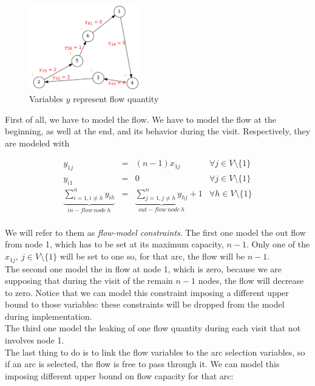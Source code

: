 \begin{figure}[h]
    \centering
    \includegraphics[width=0.43\textwidth]{figures/gg}
    \caption[GG example]{Variables $y$ represent flow quantity}
    \label{fig:GG_example}
\end{figure}

First of all, we have to model the flow. We have to model the flow at the
beginning, as well at the end, and its behavior during the visit.
Respectively, they are modeled with

\begin{equation*} 
    \begin{array}{rrlr} 
        y_{1j} & = & (n - 1) x_{1j} & \forall j \in V \setminus \{1\} \\
        y_{i1} & = & 0 &\forall j \in V \setminus \{1\} \\
        \underbrace{\displaystyle\sum\limits_{i = 1, i \neq h}^n y_{ih}}_{in-flow\ node\ h} & = & \underbrace{\displaystyle\sum\limits_{j = 1, j \neq h}^n y_{hj}}_{out-flow\ node\ h} + 1 & \forall h \in V \setminus \{1\}\\
    \end{array} 
\end{equation*}

We will refer to them as \emph{flow-model constraints}. The first one model the
out flow from node 1, which has to be set at its maximum capacity, $n - 1$.
Only one of the $x_{1j},\ j \in V \setminus \{1\}$ will be set to one so, for
that arc, the flow will be $n - 1$.\\ The second one model the in flow at node
1, which is zero, because we are supposing that during the visit of the remain
$n - 1$ nodes, the flow will decrease to zero. Notice that we can model this
constraint imposing a different upper bound to those variables: these
constraints will be dropped from the model during implementation.\\ The third
one model the leaking of one flow quantity during each visit that not involves
node 1.\\
The last thing to do is to link the flow variables to the arc selection
variables, so if an arc is selected, the flow is free to pass through it. We
can model this imposing different upper bound on flow capacity for that arc:

